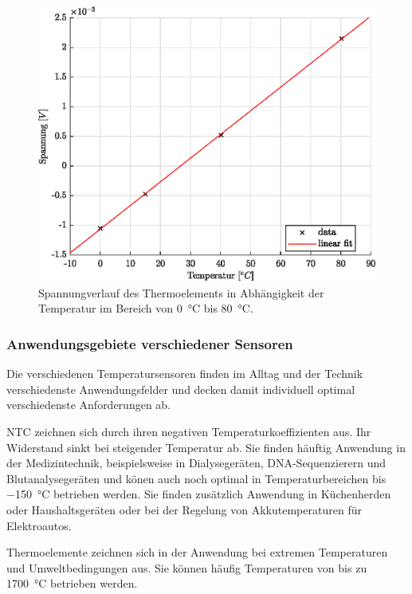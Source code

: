 \begin{figure}[H]
	\centering
	\includegraphics[height=0.3\textheight]{../MLAB/Spannung.eps}
	\caption[Spannungverlauf des Thermoelements in Abhängigkeit der Temperatur im Bereich von \SI{0}{\celsius} bis \SI{80}{\celsius} ]{Spannungverlauf des Thermoelements in Abhängigkeit der Temperatur im Bereich von \SI{0}{\celsius} bis \SI{80}{\celsius}.}
	\label{fig:Spannung}
\end{figure}

\subsubsection{Anwendungsgebiete verschiedener Sensoren}

Die verschiedenen Temperatursensoren finden im Alltag und der Technik verschiedenste Anwendungsfelder und decken damit individuell optimal verschiedenste Anforderungen ab. 

NTC zeichnen sich durch ihren negativen Temperaturkoeffizienten aus. Ihr Widerstand sinkt bei steigender Temperatur ab. Sie finden häuftig Anwendung in der Medizintechnik, beispielsweise in Dialysegeräten, DNA-Sequenzierern und Blutanalysegeräten und könen auch noch optimal in Temperaturbereichen bis \SI{-150}{\celsius} betrieben werden. Sie finden zusätzlich Anwendung in Küchenherden oder Haushaltsgeräten oder bei der Regelung von Akkutemperaturen für Elektroautos. 

Thermoelemente zeichnen sich in der Anwendung bei extremen Temperaturen und Umweltbedingungen aus. Sie können häufig Temperaturen von bis zu \SI{1700}{\celsius} betrieben werden. 

